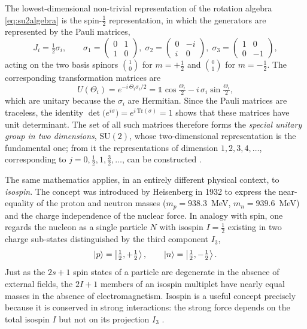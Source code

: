 The lowest-dimensional non-trivial representation of the rotation algebra
\eqref{eq:su2algebra} is the spin-$\tfrac{1}{2}$ representation, in which the
generators are represented by the Pauli matrices,
\begin{equation}
    J_i = \tfrac{1}{2}\sigma_i ,
    \qquad
    \sigma_1 = \begin{pmatrix} 0 & 1 \\ 1 & 0 \end{pmatrix},\;
    \sigma_2 = \begin{pmatrix} 0 & -i \\ i & 0 \end{pmatrix},\;
    \sigma_3 = \begin{pmatrix} 1 & 0 \\ 0 & -1 \end{pmatrix},
\end{equation}
acting on the two basis spinors $\binom{1}{0}$ for $m = +\tfrac{1}{2}$ and
$\binom{0}{1}$ for $m = -\tfrac{1}{2}$. The corresponding transformation matrices
are
\begin{equation}
    U(\Theta_i) = e^{-i\,\Theta_i \sigma_i/2}
    = \mathbb{1}\cos\tfrac{\Theta_i}{2} - i\,\sigma_i \sin\tfrac{\Theta_i}{2},
\end{equation}
which are unitary because the $\sigma_i$ are Hermitian. Since the Pauli matrices are
traceless, the identity $\det\!\big(e^{i\sigma}\big) = e^{i\,\mathrm{Tr}(\sigma)} =
1$ shows that these matrices have unit determinant. The set of all such matrices
therefore forms the \emph{special unitary group in two dimensions},
$\mathrm{SU}(2)$, whose two-dimensional representation is the fundamental one; from
it the representations of dimension $1, 2, 3, 4, \dots$, corresponding to $j = 0,
\tfrac{1}{2}, 1, \tfrac{3}{2}, \dots$, can be constructed \cite[Ch.~6]{Amsler2018}.

The same mathematics applies, in an entirely different physical context, to
\emph{isospin}. The concept was introduced by Heisenberg in 1932 to express the
near-equality of the proton and neutron masses ($m_p = 938.3$~MeV, $m_n =
939.6$~MeV) and the charge independence of the nuclear force. In analogy with spin,
one regards the nucleon as a single particle $N$ with isospin $I = \tfrac{1}{2}$
existing in two charge sub-states distinguished by the third component $I_{3}$,
\begin{equation}
    \ket{p} = \ket{\tfrac{1}{2}, +\tfrac{1}{2}},
    \qquad
    \ket{n} = \ket{\tfrac{1}{2}, -\tfrac{1}{2}}.
\end{equation}
Just as the $2s+1$ spin states of a particle are degenerate in the absence of
external fields, the $2I+1$ members of an isospin multiplet have nearly equal masses
in the absence of electromagnetism. Isospin is a useful concept precisely because it
is conserved in strong interactions: the strong force depends on the total isospin
$I$ but not on its projection $I_3$ \cite[Ch.~3]{Amsler2018}.


